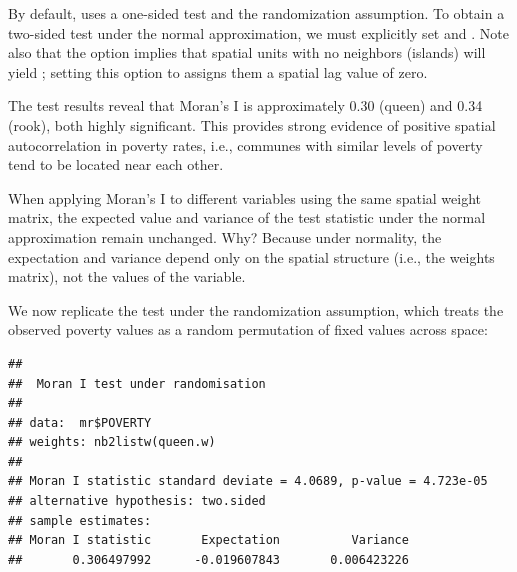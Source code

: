 By default,  uses a one-sided test and the randomization assumption. To obtain a two-sided test under the normal approximation, we must explicitly set  and . Note also that the option  implies that spatial units with no neighbors (islands) will yield ; setting this option to  assigns them a spatial lag value of zero.

The test results reveal that Moran’s I is approximately 0.30 (queen) and 0.34 (rook), both highly significant. This provides strong evidence of positive spatial autocorrelation in poverty rates, i.e., communes with similar levels of poverty tend to be located near each other.


\begin{remark}
When applying Moran’s I to different variables using the same spatial weight matrix, the expected value and variance of the test statistic under the normal approximation remain unchanged. Why? Because under normality, the expectation and variance depend only on the spatial structure (i.e., the weights matrix), not the values of the variable.
\end{remark}

We now replicate the test under the randomization assumption, which treats the observed poverty values as a random permutation of fixed values across space:

\begin{knitrout}
\color{fgcolor}\begin{kframe}
\begin{alltt}
\hlopt{$}  \hldef{=} 
            \hldef{=} \hldef{)}
\end{alltt}
\begin{verbatim}
## 
## 	Moran I test under randomisation
## 
## data:  mr$POVERTY  
## weights: nb2listw(queen.w)    
## 
## Moran I statistic standard deviate = 4.0689, p-value = 4.723e-05
## alternative hypothesis: two.sided
## sample estimates:
## Moran I statistic       Expectation          Variance 
##       0.306497992      -0.019607843       0.006423226
\end{verbatim}
\end{kframe}
\end{knitrout}

